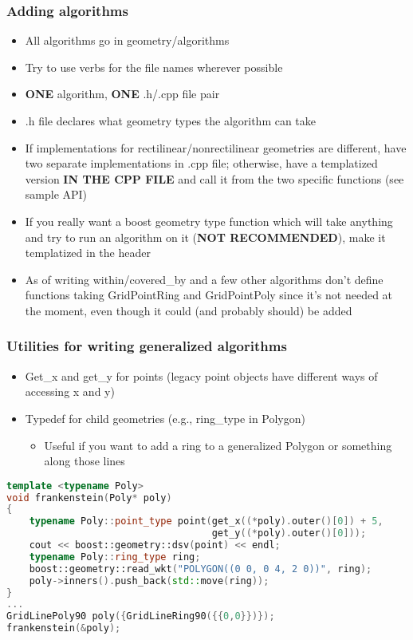 \documentclass{beamer}
\begin{document}
\begin{frame}
    \frametitle{Adding algorithms}
    \small
    \begin{itemize}
        \item All algorithms go in geometry/algorithms
        \item Try to use verbs for the file names wherever possible
        \item \textbf{ONE} algorithm, \textbf{ONE} .h/.cpp file pair
        \item .h file declares what geometry types the algorithm can take
        \item If implementations for rectilinear/nonrectilinear geometries are different, have two separate implementations in .cpp file; otherwise, have a templatized version \textbf{IN THE CPP FILE} and call it from the two specific functions (see sample API)
        \item If you really want a boost geometry type function which will take anything and try to run an algorithm on it (\textbf{NOT RECOMMENDED}), make it templatized in the header
        \item As of writing within/covered\_by and a few other algorithms don't define functions taking GridPointRing and GridPointPoly since it's not needed at the moment, even though it could (and probably should) be added
    \end{itemize}
\end{frame}

\begin{frame}[fragile]
    \frametitle{Utilities for writing generalized algorithms}
    \begin{itemize}
        \item Get\_x and get\_y for points (legacy point objects have different ways of accessing x and y)
        \item Typedef for child geometries (e.g., ring\_type in Polygon)
            \begin{itemize}
                \item Useful if you want to add a ring to a generalized Polygon or something along those lines
            \end{itemize}
    \end{itemize}
    \begin{lstlisting}[language=C++, basicstyle=\tiny]
template <typename Poly>
void frankenstein(Poly* poly)
{
    typename Poly::point_type point(get_x((*poly).outer()[0]) + 5,
                                    get_y((*poly).outer()[0]));
    cout << boost::geometry::dsv(point) << endl;
    typename Poly::ring_type ring;
    boost::geometry::read_wkt("POLYGON((0 0, 0 4, 2 0))", ring);
    poly->inners().push_back(std::move(ring));
}
...
GridLinePoly90 poly({GridLineRing90({{0,0}})});
frankenstein(&poly);
    \end{lstlisting}
\end{frame}
\end{document}
